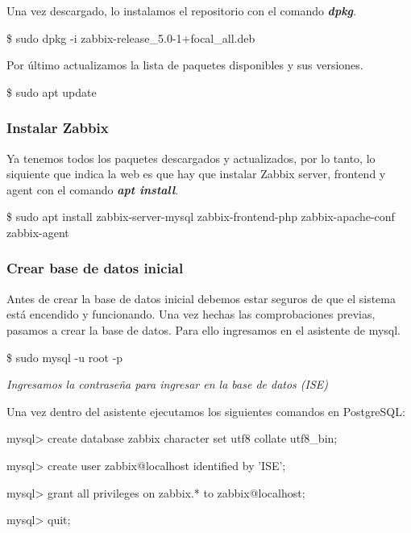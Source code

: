     Una vez descargado, lo instalamos el repositorio con el comando \textbf{\emph{dpkg}}.
        \begin{tcolorbox}[colback=black!10, halign=left]
            \$ sudo dpkg -i zabbix-release\_5.0-1+focal\_all.deb
        \end{tcolorbox}

    Por último actualizamos la lista de paquetes disponibles y sus versiones.
        \begin{tcolorbox}[colback=black!10, halign=left]
            \$ sudo apt update
        \end{tcolorbox}

    \newpage
    \subsubsection{Instalar Zabbix}

    Ya tenemos todos los paquetes descargados y actualizados, por lo tanto, lo siquiente que indica la web es que hay que instalar Zabbix server, frontend
    y agent con el comando \textbf{\emph{apt install}}.
        \begin{tcolorbox}[colback=black!10, halign=left]
            \$ sudo apt install zabbix-server-mysql zabbix-frontend-php zabbix-apache-conf zabbix-agent
        \end{tcolorbox}
    
    \subsubsection{Crear base de datos inicial}
    Antes de crear la base de datos inicial debemos estar seguros de que el sistema está encendido y funcionando. Una vez hechas las comprobaciones previas,
    pasamos a crear la base de datos. Para ello ingresamos en el asistente de mysql.
        \begin{tcolorbox}[colback=black!10, halign=left]
            \$ sudo mysql -u root -p

            \emph{Ingresamos la contraseña para ingresar en la base de datos (ISE)}
        \end{tcolorbox}

    Una vez dentro del asistente ejecutamos los siguientes comandos en PostgreSQL:
        \begin{tcolorbox}[colback=black!10, halign=left]
            mysql> create database zabbix character set utf8 collate utf8\_bin;

            mysql> create user zabbix@localhost identified by 'ISE';

            mysql> grant all privileges on zabbix.* to zabbix@localhost;

            mysql> quit;
        \end{tcolorbox}

